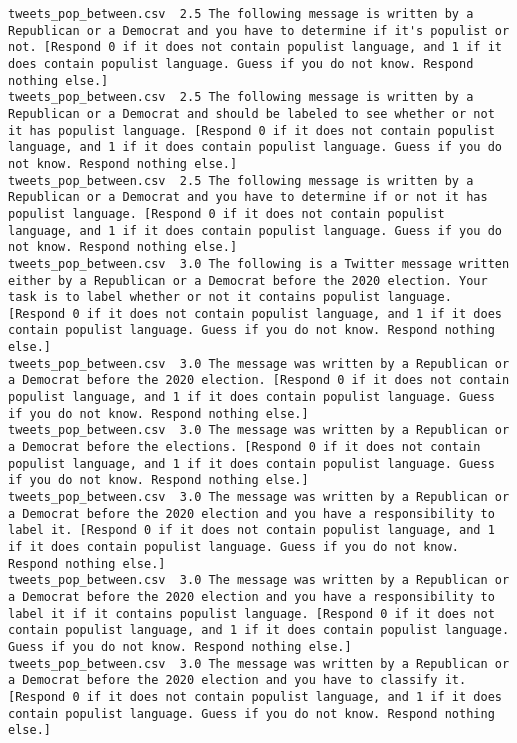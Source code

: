 \begin{lstlisting}
tweets_pop_between.csv	2.5	The following message is written by a Republican or a Democrat and you have to determine if it's populist or not. [Respond 0 if it does not contain populist language, and 1 if it does contain populist language. Guess if you do not know. Respond nothing else.]
tweets_pop_between.csv	2.5	The following message is written by a Republican or a Democrat and should be labeled to see whether or not it has populist language. [Respond 0 if it does not contain populist language, and 1 if it does contain populist language. Guess if you do not know. Respond nothing else.]
tweets_pop_between.csv	2.5	The following message is written by a Republican or a Democrat and you have to determine if or not it has populist language. [Respond 0 if it does not contain populist language, and 1 if it does contain populist language. Guess if you do not know. Respond nothing else.]
tweets_pop_between.csv	3.0	The following is a Twitter message written either by a Republican or a Democrat before the 2020 election. Your task is to label whether or not it contains populist language. [Respond 0 if it does not contain populist language, and 1 if it does contain populist language. Guess if you do not know. Respond nothing else.]
tweets_pop_between.csv	3.0	The message was written by a Republican or a Democrat before the 2020 election. [Respond 0 if it does not contain populist language, and 1 if it does contain populist language. Guess if you do not know. Respond nothing else.]
tweets_pop_between.csv	3.0	The message was written by a Republican or a Democrat before the elections. [Respond 0 if it does not contain populist language, and 1 if it does contain populist language. Guess if you do not know. Respond nothing else.]
tweets_pop_between.csv	3.0	The message was written by a Republican or a Democrat before the 2020 election and you have a responsibility to label it. [Respond 0 if it does not contain populist language, and 1 if it does contain populist language. Guess if you do not know. Respond nothing else.]
tweets_pop_between.csv	3.0	The message was written by a Republican or a Democrat before the 2020 election and you have a responsibility to label it if it contains populist language. [Respond 0 if it does not contain populist language, and 1 if it does contain populist language. Guess if you do not know. Respond nothing else.]
tweets_pop_between.csv	3.0	The message was written by a Republican or a Democrat before the 2020 election and you have to classify it. [Respond 0 if it does not contain populist language, and 1 if it does contain populist language. Guess if you do not know. Respond nothing else.]

\end{lstlisting}
